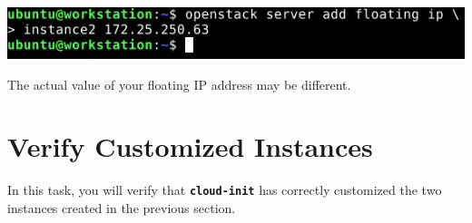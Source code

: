 \documentclass[letterpaper, 12pt]{article}
\begin{document}
\begin{enumerate}
    \begin{center}
        \includegraphics[width=\linewidth]{images/part1/step38.png}
    \end{center}

    \begin{notebox}{}
        The actual value of your floating IP address may be different.
    \end{notebox}

\end{enumerate}

\section{Verify Customized Instances}
\label{sec:verify_customized_instances}
In this task, you will verify that \textbf{\texttt{cloud-init}} has correctly customized the two instances created in the
previous section.
\end{document}
